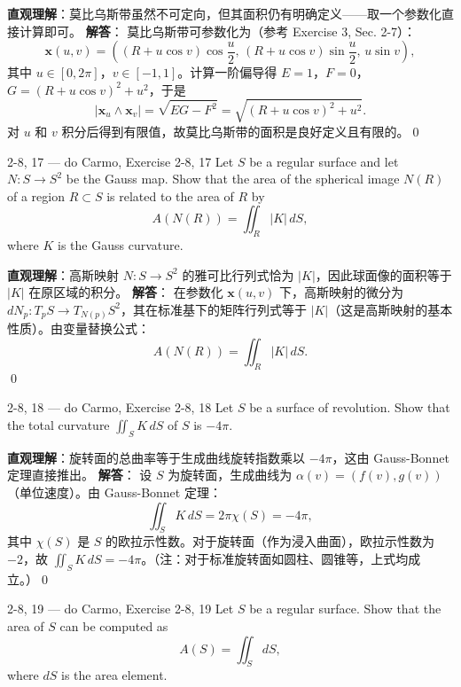 \begin{solution}
\textbf{直观理解}：莫比乌斯带虽然不可定向，但其面积仍有明确定义——取一个参数化直接计算即可。
\textbf{解答}：
莫比乌斯带可参数化为（参考 Exercise 3, Sec. 2-7）：
\[
\mathbf{x}(u, v) = \left((R + u\cos v)\cos\frac{u}{2}, \, (R + u\cos v)\sin\frac{u}{2}, \, u\sin v\right),
\]
其中 $u \in [0, 2\pi]$，$v \in [-1, 1]$。计算一阶偏导得 $E = 1$，$F = 0$，$G = (R+u\cos v)^2 + u^2$，于是
\[
|\mathbf{x}_u \wedge \mathbf{x}_v| = \sqrt{EG-F^2} = \sqrt{(R+u\cos v)^2 + u^2}.
\]
对 $u$ 和 $v$ 积分后得到有限值，故莫比乌斯带的面积是良好定义且有限的。\qed
\end{solution}
\begin{exercise}
{2-8, 17 — do Carmo, Exercise 2-8, 17}
Let $S$ be a regular surface and let $N: S \to S^2$ be the Gauss map. Show that the area of the spherical image $N(R)$ of a region $R \subset S$ is related to the area of $R$ by
\[
A(N(R)) = \iint_R |K| \, dS,
\]
where $K$ is the Gauss curvature.


\end{exercise}

\begin{solution}
\textbf{直观理解}：高斯映射 $N: S \to S^2$ 的雅可比行列式恰为 $|K|$，因此球面像的面积等于 $|K|$ 在原区域的积分。
\textbf{解答}：
在参数化 $\mathbf{x}(u, v)$ 下，高斯映射的微分为 $dN_p: T_pS \to T_{N(p)}S^2$，其在标准基下的矩阵行列式等于 $|K|$（这是高斯映射的基本性质）。由变量替换公式：
\[
A(N(R)) = \iint_R |K| \, dS.
\]
\qed
\end{solution}
\begin{exercise}
{2-8, 18 — do Carmo, Exercise 2-8, 18}
Let $S$ be a surface of revolution. Show that the total curvature $\iint_S K \, dS$ of $S$ is $-4\pi$.


\end{exercise}

\begin{solution}
\textbf{直观理解}：旋转面的总曲率等于生成曲线旋转指数乘以 $-4\pi$，这由 Gauss-Bonnet 定理直接推出。
\textbf{解答}：
设 $S$ 为旋转面，生成曲线为 $\alpha(v) = (f(v), g(v))$（单位速度）。由 Gauss-Bonnet 定理：
\[
\iint_S K \, dS = 2\pi \chi(S) = -4\pi,
\]
其中 $\chi(S)$ 是 $S$ 的欧拉示性数。对于旋转面（作为浸入曲面），欧拉示性数为 $-2$，故 $\iint_S K \, dS = -4\pi$。（注：对于标准旋转面如圆柱、圆锥等，上式均成立。）\qed
\end{solution}
\begin{exercise}
{2-8, 19 — do Carmo, Exercise 2-8, 19}
Let $S$ be a regular surface. Show that the area of $S$ can be computed as
\[
A(S) = \iint_S dS,
\]
where $dS$ is the area element.


\end{exercise}

